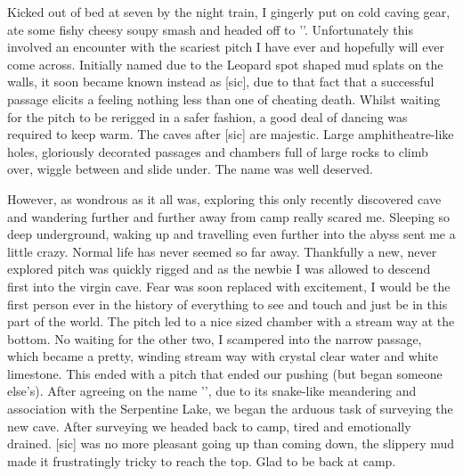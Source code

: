 Kicked out of bed at seven by the night train, I gingerly put on cold caving gear, ate some fishy
cheesy soupy smash and headed off to ''. Unfortunately this involved an encounter with
the scariest pitch I have ever and hopefully will ever come across. Initially named  due to the
Leopard spot shaped mud splats on the walls, it soon became known instead as [sic], due to that
fact that a successful passage elicits a feeling nothing less than one of cheating death. Whilst waiting
for the pitch to be rerigged in a safer fashion, a good deal of dancing was required to keep warm. The
caves after [sic] are majestic. Large amphitheatre-like holes, gloriously decorated passages and
chambers full of large rocks to climb over, wiggle between and slide under. The name  was
well deserved.


However, as wondrous as it all was, exploring this only recently discovered cave and wandering
further and further away from camp really scared me. Sleeping so deep underground, waking up and
travelling even further into the abyss sent me a little crazy. Normal life has never seemed so far away.
Thankfully a new, never explored pitch was quickly rigged and as the newbie I was allowed to descend
first into the virgin cave. Fear was soon replaced with excitement, I would be the first person ever in
the history of everything to see and touch and just be in this part of the world. The pitch led to a
nice sized chamber with a stream way at the bottom. No waiting for the other two, I scampered into
the narrow passage, which became a pretty, winding stream way with crystal clear water and white limestone. This ended with a pitch that ended our pushing (but began someone else's). After agreeing
on the name '', due to its snake-like meandering and association with the Serpentine Lake,
we began the arduous task of surveying the new cave. After surveying we headed back to camp, tired
and emotionally drained. [sic] was no more pleasant going up than coming down, the slippery
mud made it frustratingly tricky to reach the top. Glad to be back at camp.

